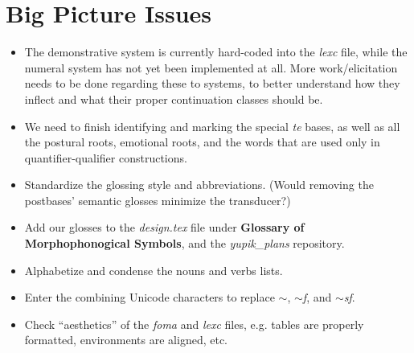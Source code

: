 \documentclass{article}
\begin{document}

\section{Big Picture Issues}

\begin{itemize}
\renewcommand\labelitemi{$\cdot$}

\item The demonstrative system is currently hard-coded into the \textit{lexc} file, while the numeral system has not yet been implemented at all.
%
More work/elicitation needs to be done regarding these to systems, to better understand how they inflect and what their proper continuation classes should be.

\item We need to finish identifying and marking the special \textit{te} bases, as well as all the postural roots, emotional roots, and the words that are used only in quantifier-qualifier constructions.

\item Standardize the glossing style and abbreviations.
%
(Would removing the postbases' semantic glosses minimize the transducer?)

\item Add our glosses to the \textit{design.tex} file under \textbf{Glossary of Morphophonogical Symbols}, and the \textit{yupik\_plans} repository.

\item Alphabetize and condense the nouns and verbs lists.

\item Enter the combining Unicode characters to replace \textit{$\sim$}, \textit{$\sim$f}, and \textit{$\sim$sf}.

\item Check ``aesthetics'' of the \textit{foma} and \textit{lexc} files, e.g. tables are properly formatted, environments are aligned, etc.

\end{itemize}
\end{document}
